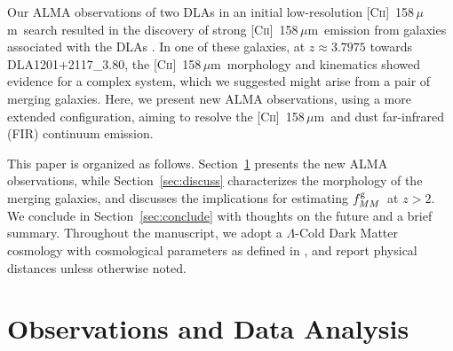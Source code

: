 \documentclass[twocolumn]{aastex62}
\newcommand{\zdla}{3.7975}
\newcommand{\dlaname}{DLA1201+2117\_3.80}
\newcommand{\cplus}{[\ctwo]~158\,$\mu$m}
\newcommand{\spatres}{2.3}    %
\newcommand{\vrperp}{18}  %
\newcommand{\mfmg}{f_{MM}^{\rm g}}    %
\newcommand{\fmg}{$\mfmg$}
\newcommand{\mmsun}{M_{\odot}}
\newcommand{\ctwo}{C\textsc{ii}}
\begin{document}


Our ALMA observations of two DLAs in an initial low-resolution \cplus\ search resulted in 
the discovery of strong \cplus\ emission from galaxies associated with the DLAs \citep{neeleman+17}. In one of these 
galaxies, at $z \approx \zdla$ towards \dlaname, the \cplus\ morphology and kinematics 
showed evidence for a complex system, which we suggested might arise from a pair of 
merging galaxies. Here, we present new ALMA observations, using a more extended 
configuration, aiming to resolve the \cplus\ and dust far-infrared (FIR) continuum 
emission.


This paper is organized as follows. Section~\ref{sec:obs} presents the new ALMA observations, while Section~\ref{sec:discuss}
characterizes the morphology of the merging galaxies, and discusses the implications for estimating \fmg\ at $z>2$. We conclude in Section~\ref{sec:conclude} with thoughts on the future and a brief summary. Throughout the manuscript, we adopt a $\Lambda$-Cold Dark Matter cosmology with cosmological parameters as defined in  \citet{Planck2015}, and report physical distances unless otherwise noted.

\section{Observations and Data Analysis}
\label{sec:obs}
\end{document}
